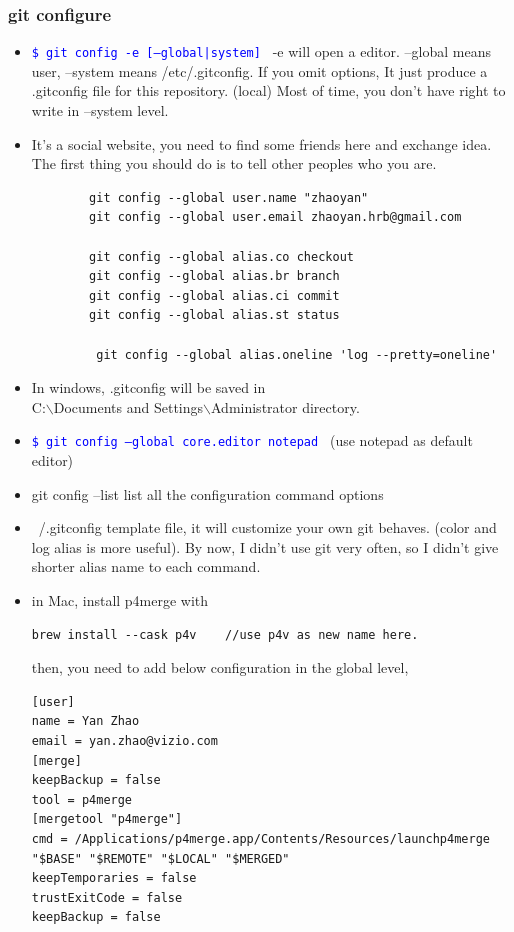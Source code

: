 \documentclass[a4paper,11pt,twoside]{book}
\newcommand{\linuxcommand}[1]{\texttt{\textcolor{blue}{\$ #1 \Pisymbol{psy}{191}}}}
\begin{document}
\subsubsection{git configure}
\begin{itemize}
	
	\item \linuxcommand{git config -e [--global|system]}  -e will open a editor. --global means user, --system means /etc/.gitconfig.   If you omit options, It just produce a .gitconfig file for this repository. (local) Most of time, you don't have right to write in --system level. 
	
	\item It's a social website, you need to find some friends here and exchange idea. The first thing you should do is to tell other peoples who you are.  
	\begin{verbatim}
		git config --global user.name "zhaoyan"
		git config --global user.email zhaoyan.hrb@gmail.com
		
		git config --global alias.co checkout
		git config --global alias.br branch
		git config --global alias.ci commit
		git config --global alias.st status
		
		 git config --global alias.oneline 'log --pretty=oneline'
	\end{verbatim}
	
	\item In windows, .gitconfig will be saved in  \\
	C:$\backslash$Documents and Settings$\backslash$Administrator directory.
	\item \linuxcommand{git config --global core.editor notepad} (use notepad as default editor)
	\item git config --list list all the configuration command options
	
	
	\item  ~/.gitconfig template file, it will customize your own git behaves. (color and log alias is more useful). By now, I didn't use git very often, so I didn't give shorter alias name to each command.
	
	\item in Mac, install p4merge with  
\begin{lstlisting}
brew install --cask p4v    //use p4v as new name here. 
\end{lstlisting}
then, you need to add below configuration in the global level,  
	
\begin{lstlisting}
[user]
name = Yan Zhao
email = yan.zhao@vizio.com
[merge]
keepBackup = false
tool = p4merge
[mergetool "p4merge"]
cmd = /Applications/p4merge.app/Contents/Resources/launchp4merge "$BASE" "$REMOTE" "$LOCAL" "$MERGED"
keepTemporaries = false
trustExitCode = false
keepBackup = false


\end{lstlisting}
\end{itemize}
\end{document}
